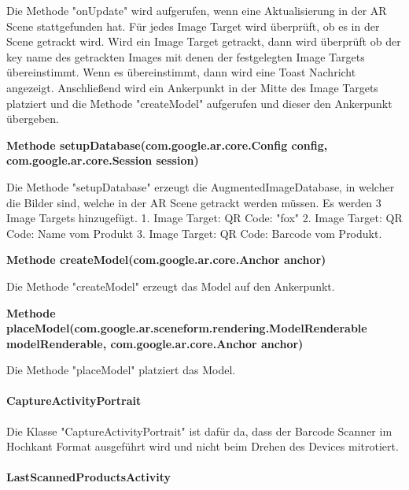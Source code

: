 \documentclass{scrartcl}
\begin{document}
\noindent Die Methode "onUpdate" wird aufgerufen, wenn eine Aktualisierung in der AR Scene stattgefunden hat. Für jedes Image Target wird überprüft, ob es in der Scene getrackt wird. Wird ein Image Target getrackt, dann wird überprüft ob der key name des getrackten Images mit denen der festgelegten Image Targets übereinstimmt. Wenn es übereinstimmt, dann wird eine Toast Nachricht angezeigt. Anschließend wird ein Ankerpunkt in der Mitte des Image Targets platziert und die Methode "createModel" aufgerufen und dieser den Ankerpunkt übergeben. \newline

\noindent\textbf{Methode setupDatabase(com.google.ar.core.Config config, \newline com.google.ar.core.Session session)}

\noindent Die Methode "setupDatabase" erzeugt die AugmentedImageDatabase, in welcher die Bilder sind, welche in der AR Scene getrackt werden müssen. Es werden 3 Image Targets hinzugefügt. 1. Image Target: QR Code: "fox" 2. Image Target: QR Code: Name vom Produkt 3. Image Target: QR Code: Barcode vom Produkt. \newline

\noindent\textbf{Methode createModel(com.google.ar.core.Anchor anchor)}

\noindent Die Methode "createModel" erzeugt das Model auf den Ankerpunkt. \newline

\noindent\textbf{Methode 	placeModel(com.google.ar.sceneform.rendering.ModelRenderable \newline modelRenderable, com.google.ar.core.Anchor anchor)}

\noindent Die Methode "placeModel" platziert das Model. \newline



\paragraph{CaptureActivityPortrait}

Die Klasse "CaptureActivityPortrait" ist dafür da, dass der Barcode Scanner im Hochkant Format ausgeführt wird und nicht beim Drehen des Devices mitrotiert. \newline 


\paragraph{LastScannedProductsActivity}
\end{document}
